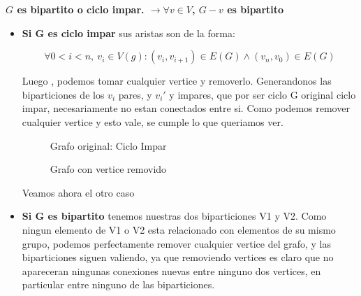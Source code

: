 \documentclass{article}
\begin{document}
\textbf{$G$ es bipartito o ciclo impar. $\rightarrow \forall v \in V$, $G-v$ es bipartito} 
\begin{itemize}
\item \textbf{Si G es ciclo impar} sus aristas son de la forma:

\[\forall 0 < i < n,\ v_i \in V(g) : (v_i,v_{i+1}) \in E(G) \land   (v_n,v_0) \in E(G) \]

Luego , podemos tomar cualquier vertice y removerlo. Generandonos las biparticiones de los $v_i$  pares,  y $v_i'$ y impares, que por ser ciclo G original ciclo impar, necesariamente no estan conectados entre si. Como podemos remover cualquier vertice y esto vale, se cumple lo que queriamos ver.

\begin{figure}[h]
\centering
\begin{minipage}{0.4\textwidth}
\centering
{}
\caption*{Grafo original: Ciclo Impar}
\end{minipage}
\hspace{1cm}
\begin{minipage}{0.4\textwidth}
\centering
{}
\caption*{Grafo con vertice removido}
\end{minipage}
\end{figure}
\begin{center}
Veamos ahora el otro caso
\end{center}
\newpage
\item \textbf{Si G es bipartito} tenemos nuestras dos biparticiones V1 y V2. Como ningun elemento de V1 o V2 esta relacionado con elementos de su mismo grupo, podemos perfectamente remover cualquier vertice del grafo, y las biparticiones siguen valiendo, ya que removiendo vertices es claro que no apareceran ningunas conexiones nuevas entre ninguno dos vertices, en particular entre ninguno de las biparticiones.


\end{itemize}
\end{document}
